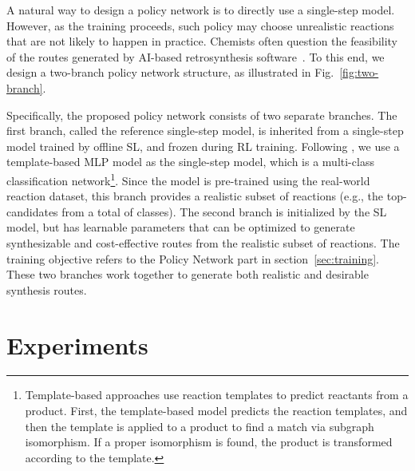 \documentclass[nohyperref]{article}
\theoremstyle{plain}
\theoremstyle{definition}
\theoremstyle{remark}
\begin{document}
A natural way to design a policy network is to directly use a single-step model. However, as the training proceeds, 
such policy may choose unrealistic reactions that are not likely to happen in practice. 
Chemists often question the feasibility of the routes generated by AI-based retrosynthesis software~\cite{genheden2022paroutes}.
To this end, 
we design a two-branch policy network structure, as illustrated in Fig.~\ref{fig:two-branch}.  







Specifically, the proposed policy network consists of two separate branches. 
The first branch, called the reference single-step model, is inherited from a single-step model trained by offline SL, and frozen during RL training. 
Following \citep{Segler2018PlanningCS, chen20retrostar}, we use a template-based MLP model as the single-step model, which is a multi-class classification network\footnote{Template-based approaches use reaction templates to predict reactants from a product. First, the template-based model predicts the reaction templates, and then the template is applied to a product to find a match via subgraph isomorphism. If a proper isomorphism is found, the product is transformed according to the template.}.
Since the model is pre-trained using the real-world reaction dataset, 
this branch provides a realistic subset of reactions (e.g., the top- candidates from a total of  classes).
The second branch is initialized by the SL model, but has learnable parameters that can be optimized to generate synthesizable and cost-effective routes from the realistic subset of reactions. 
The training objective refers to the Policy Network part in section~\ref{sec:training}.
These two branches work together to generate both realistic and desirable synthesis routes.



\section{Experiments}
\end{document}
